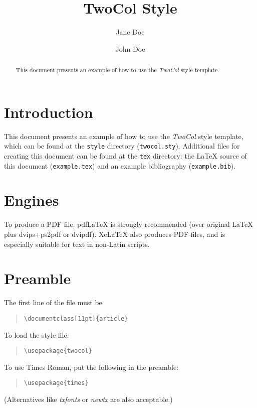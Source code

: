 \documentclass[11pt]{article}
\title{TwoCol Style}
\begin{document}
\author[1]{Jane Doe}
\author[2]{John Doe}
\maketitle
\begin{abstract}
This document presents an example of how to use the \emph{TwoCol} style template.
\end{abstract}

\section{Introduction}
This document presents an example of how to use the \emph{TwoCol} style template, which can be found at the \verb|style| directory (\texttt{twocol.sty}). Additional files for creating this document can be found at the \verb|tex| directory: the \LaTeX{} source of this document (\texttt{example.tex}) and an example bibliography (\texttt{example.bib}).

\section{Engines}
To produce a PDF file, pdf\LaTeX{} is strongly recommended (over original \LaTeX{} plus dvips+ps2pdf or dvipdf). Xe\LaTeX{} also produces PDF files, and is especially suitable for text in non-Latin scripts.

\section{Preamble}
The first line of the file must be
\begin{quote}
\begin{verbatim}
\documentclass[11pt]{article}
\end{verbatim}
\end{quote}

To load the style file:
\begin{quote}
\begin{verbatim}
\usepackage{twocol}
\end{verbatim}
\end{quote}

To use Times Roman, put the following in the preamble:
\begin{quote}
\begin{verbatim}
\usepackage{times}
\end{verbatim}
\end{quote}
(Alternatives like \emph{txfonts} or \emph{newtx} are also acceptable.)
\end{document}
